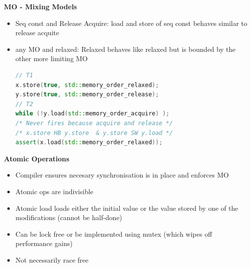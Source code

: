 \documentclass[10pt, landscape]{article}
\begin{document}
\begin{multicols}{4}
\textbf{MO - Mixing Models} \\
\begin{itemize}
    \item Seq const and Release Acquire: load and store of seq const behaves similar to release acquite 
    \item any MO and relaxed: Relaxed behaves like relaxed but is bounded by the other more limiting MO 
    \begin{lstlisting}[language=C++]
// T1
x.store(true, std::memory_order_relaxed);
y.store(true, std::memory_order_release);
// T2
while (!y.load(std::memory_order_acquire) );
/* Never fires because acquire and release */
/* x.store HB y.store  & y.store SW y.load */
assert(x.load(std::memory_order_relaxed)); 
    \end{lstlisting}
\end{itemize}

\textbf{Atomic Operations} \\ 
\begin{itemize}
    \item Compiler ensures necesary synchronisation is in place and enforces MO 
    \item Atomic ops are indivisible
    \item Atomic load loads either the initial value or the value stored by one of the modifications (cannot be half-done)
    \item Can be lock free or be implemented using mutex (which wipes off performance gains)
    \item Not necessarily race free
\end{itemize}



\end{multicols}
\end{document}
